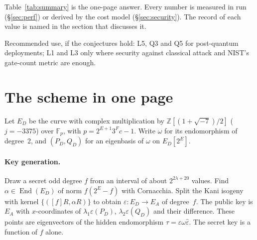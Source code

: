 \documentclass[11pt,a4paper]{article}
\newcommand{\F}{\mathbb{F}}
\newcommand{\Z}{\mathbb{Z}}
\newcommand{\End}{\operatorname{End}}
\newcommand{\EA}{E_A}
\newcommand{\ED}{E_D}
\begin{document}
Table~\ref{tab:summary} is the one-page answer. Every number is measured in
run \texttt{\BenchRunId} (\S\ref{sec:perf}) or derived by the cost model
(\S\ref{sec:security}). The record of each value is named in the section
that discusses it.

\begin{table}[h]
\centering
\caption{The five parameter sets at a glance. Sizes are exact. Times are
medians on one shared 4-vCPU VM (\S\ref{sec:method}). Security columns are
$\log_2$ of the cheapest known attack, from the cost model.}
\label{tab:summary}
\end{table}

Recommended use, if the conjectures hold: L5, Q3 and Q5 for post-quantum
deployments; L1 and L3 only where security against classical attack and
NIST's gate-count metric are enough.

\section{The scheme in one page}\label{sec:scheme}

Let $\ED$ be the curve with complex multiplication by $\Z[(1+\sqrt{-7})/2]$
($j=-3375$) over $\F_p$, with $p=2^{E+1}3^Fc-1$. Write $\omega$ for its
endomorphism of degree~2, and $(P_D,Q_D)$ for an eigenbasis of $\omega$ on
$\ED[2^E]$.

\paragraph{Key generation.} Draw a secret odd degree $f$ from an interval of
about $2^{2\lambda+20}$ values. Find $\alpha\in\End(\ED)$ of norm
$f(2^E-f)$ with Cornacchia. Split the Kani isogeny with kernel
$\{([f]R,\alpha R)\}$ to obtain $\varepsilon:\ED\to\EA$ of degree~$f$. The
public key is $\EA$ with $x$-coordinates of $\lambda_1\varepsilon(P_D)$,
$\lambda_2\varepsilon(Q_D)$ and their difference. These points are
eigenvectors of the hidden endomorphism $\tau=\varepsilon\omega\hat\varepsilon$.
The secret key is a function of $f$ alone.
\end{document}
